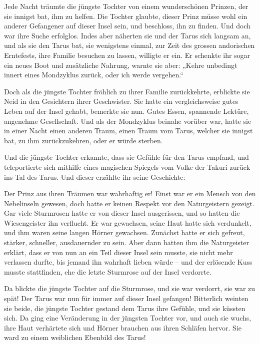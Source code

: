 \documentclass[10pt, a4paper, oneside]{book}
\begin{document}
Jede Nacht träumte die jüngste Tochter von einem wunderschönen Prinzen, der sie innigst bat, ihm zu helfen. Die Tochter glaubte, dieser Prinz müsse wohl ein anderer Gefangener auf dieser Insel sein, und beschloss, ihn zu finden. Und doch war ihre Suche erfolglos. Indes aber näherten sie und der Tarus sich langsam an, und als sie den Tarus bat, sie wenigstens einmal, zur Zeit des grossen andorischen Erntefests, ihre Familie besuchen zu lassen, willigte er ein. Er schenkte ihr sogar ein neues Boot und zusätzliche Nahrung, warnte sie aber: „Kehre unbedingt innert eines Mondzyklus zurück, oder ich werde vergehen.“

Doch als die jüngste Tochter fröhlich zu ihrer Familie zurückkehrte, erblickte sie Neid in den Gesichtern ihrer Geschwister. Sie hatte ein vergleichsweise gutes Leben auf der Insel gehabt, bemerkte sie nun. Gutes Essen, spannende Lektüre, angenehme Gesellschaft. Und als der Mondzyklus beinahe vorüber war, hatte sie in einer Nacht einen anderen Traum, einen Traum vom Tarus, welcher sie innigst bat, zu ihm zurückzukehren, oder er würde sterben.

Und die jüngste Tochter erkannte, dass sie Gefühle für den Tarus empfand, und teleportierte sich mithilfe eines magischen Spiegels vom Volke der Takuri zurück ins Tal des Tarus. Und dieser erzählte ihr seine Geschichte:

Der Prinz aus ihren Träumen war wahrhaftig er! Einst war er ein Mensch von den Nebelinseln gewesen, doch hatte er keinen Respekt vor den Naturgeistern gezeigt. Gar viele Sturmrosen hatte er von dieser Insel ausgerissen, und so hatten die Wiesengeister ihn verflucht. Er war gewachsen, seine Haut hatte sich verdunkelt, und ihm waren seine langen Hörner gewachsen. Zunächst hatte er sich gefreut, stärker, schneller, ausdauernder zu sein. Aber dann hatten ihm die Naturgeister erklärt, dass er von nun an ein Teil dieser Insel sein musste, sie nicht mehr verlassen durfte, bis jemand ihn wahrhaft lieben würde – und der erlösende Kuss musste stattfinden, ehe die letzte Sturmrose auf der Insel verdorrte.

Da blickte die jüngste Tochter auf die Sturmrose, und sie war verdorrt, sie war zu spät! Der Tarus war nun für immer auf dieser Insel gefangen! Bitterlich weinten sie beide, die jüngste Tochter gestand dem Tarus ihre Gefühle, und sie küssten sich. Da ging eine Veränderung in der jüngsten Tochter vor, und auch sie wuchs, ihre Haut verhärtete sich und Hörner brauchen aus ihren Schläfen hervor. Sie ward zu einem weiblichen Ebenbild des Tarus!
\end{document}
